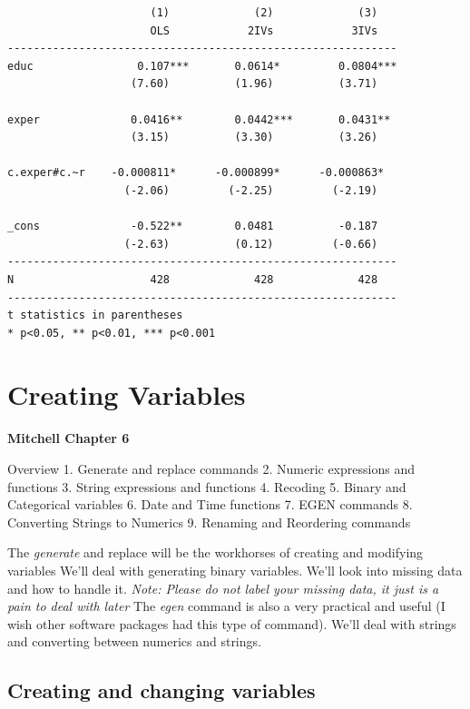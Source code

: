 \documentclass[
]{book}
\begin{document}
\begin{verbatim}
                      (1)             (2)             (3)   
                      OLS            2IVs            3IVs   
------------------------------------------------------------
educ                0.107***       0.0614*         0.0804***
                   (7.60)          (1.96)          (3.71)   

exper              0.0416**        0.0442***       0.0431** 
                   (3.15)          (3.30)          (3.26)   

c.exper#c.~r    -0.000811*      -0.000899*      -0.000863*  
                  (-2.06)         (-2.25)         (-2.19)   

_cons              -0.522**        0.0481          -0.187   
                  (-2.63)          (0.12)         (-0.66)   
------------------------------------------------------------
N                     428             428             428   
------------------------------------------------------------
t statistics in parentheses
* p<0.05, ** p<0.01, *** p<0.001
\end{verbatim}

\chapter{Creating Variables}\label{creating-variables}

\textbf{Mitchell Chapter 6}

Overview
1. Generate and replace commands
2. Numeric expressions and functions
3. String expressions and functions
4. Recoding
5. Binary and Categorical variables
6. Date and Time functions
7. EGEN commands
8. Converting Strings to Numerics
9. Renaming and Reordering commands

The \emph{generate} and replace will be the workhorses of creating and modifying variables
We'll deal with generating binary variables. We'll look into missing data and how to handle it. \emph{Note: Please do not label your missing data, it just is a pain to deal with later}
The \emph{egen} command is also a very practical and useful (I wish other software
packages had this type of command). We'll deal with strings and converting between numerics and strings.

\section{Creating and changing variables}\label{creating-and-changing-variables}
\end{document}
